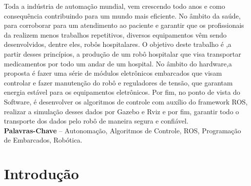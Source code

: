\documentclass[]{politex}
\begin{document}
\begin{resumo}
Toda a indústria de automação mundial, vem crescendo todo anos e como consequência contribuindo para um mundo mais eficiente. No âmbito da saúde, para corroborar para um atendimento ao paciente e garantir que os profissionais da realizem menos trabalhos repetitivos, diversos equipamentos vêm sendo desenvolvidos, dentre eles, robôs hospitalares. O objetivo deste trabalho é ,a partir desses princípios, a produção de um robô hospitalar que visa transportar medicamentos por todo um andar de um hospital. No âmbito do hardware,a proposta é fazer uma série de módulos eletrônicos embarcados que visam controlar e fazer manutenção do robô e reguladores de tensão, que garantam energia estável para os equipamentos eletrônicos. Por fim, no ponto de vista do Software, é desenvolver os algoritmos de controle com auxílio do framework ROS, realizar a simulação desses dados por Gazebo e Rviz e por fim, garantir todo o transporte dos dados pelo robô de maneira segura e confiável.
%
\\[3\baselineskip]
%
\textbf{Palavras-Chave} -- Autonomação, Algoritmos de Controle, ROS, Programação de Embarcados, Robótica.
\end{resumo}

\begin{comment}

\begin{abstract}
Abstract...
%
\\[3\baselineskip]
%
\textbf{Keywords} -- Word, Word, Word, Word, Word.
\end{abstract}
\end{comment}
\listadefiguras
\listadetabelas

\sumario


\part{Introdução}









\end{document}
